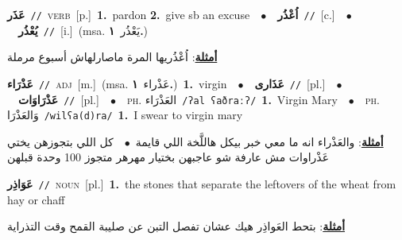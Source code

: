 \documentclass[10pt,a4paper,twoside]{article} %
\begin{document}
\begin{multicols}{2}
{\setlength\topsep{0pt}\textbf{\foreignlanguage{arabic}{عَذَر}}\ {\color{gray}\texttt{//}\color{black}}\ \textsc{verb}\ [p.]\ \textbf{1.}~pardon  \textbf{2.}~give sb an excuse\ \ $\bullet$\ \ \setlength\topsep{0pt}\textbf{\foreignlanguage{arabic}{اُعْذُر}}\ {\color{gray}\texttt{//}\color{black}}\ [c.]\ \ $\bullet$\ \ \setlength\topsep{0pt}\textbf{\foreignlanguage{arabic}{يُعْذُر}}\ {\color{gray}\texttt{//}\color{black}}\ [i.]\ \color{gray}(msa. \foreignlanguage{arabic}{يَعْذُر}~\foreignlanguage{arabic}{\textbf{١.}})\color{black}\  \begin{flushright}\color{gray}\foreignlanguage{arabic}{\textbf{\underline{\foreignlanguage{arabic}{أمثلة}}}: اُعْذُريها المرة ماصارلهاش أسبوع مرملة}\end{flushright}\color{black}} \vspace{2mm}

{\setlength\topsep{0pt}\textbf{\foreignlanguage{arabic}{عَذْرَاء}}\ {\color{gray}\texttt{//}\color{black}}\ \textsc{adj}\ [m.]\ \color{gray}(msa. \foreignlanguage{arabic}{عَذْراء}~\foreignlanguage{arabic}{\textbf{١.}})\color{black}\ \textbf{1.}~virgin\ \ $\bullet$\ \ \setlength\topsep{0pt}\textbf{\foreignlanguage{arabic}{عَذَارى}}\ {\color{gray}\texttt{//}\color{black}}\ [pl.]\ \ $\bullet$\ \ \setlength\topsep{0pt}\textbf{\foreignlanguage{arabic}{عَذْرَاوَات}}\ {\color{gray}\texttt{//}\color{black}}\ [pl.]\ \ $\bullet$\ \ \textsc{ph.} \color{gray} \foreignlanguage{arabic}{العَذْرَاء}\color{black}\ {\color{gray}\texttt{/{\sffamily ʔal ʕaðraːʔ}/}\color{black}}\ \textbf{1.}~Virgin Mary\ \ $\bullet$\ \ \textsc{ph.} \color{gray} \foreignlanguage{arabic}{وَالعَذْرَا}\color{black}\ {\color{gray}\texttt{/{\sffamily wilʕa(d)ra}/}\color{black}}\ \textbf{1.}~I swear to virgin mary\  \begin{flushright}\color{gray}\foreignlanguage{arabic}{\textbf{\underline{\foreignlanguage{arabic}{أمثلة}}}: والعَذْراء انه ما معي خبر بيكل هاللَّخة اللي قايمة\ $\bullet$\ \  كل اللي بتجوزهن يختي عَذْراوات مش عارفة شو عاجبهن بختيار مهرهر متجوز 100 وحدة قبلهن}\end{flushright}\color{black}} \vspace{2mm}

{\setlength\topsep{0pt}\textbf{\foreignlanguage{arabic}{عَوَاذِر}}\ {\color{gray}\texttt{//}\color{black}}\ \textsc{noun}\ [pl.]\ \textbf{1.}~the stones that separate the leftovers of the wheat from hay or chaff\  \begin{flushright}\color{gray}\foreignlanguage{arabic}{\textbf{\underline{\foreignlanguage{arabic}{أمثلة}}}: بتحط العَواذِر هيك عشان تفصل التبن عن صليبة القمح وقت التذراية}\end{flushright}\color{black}} \vspace{2mm}


\end{multicols}
\end{document}
